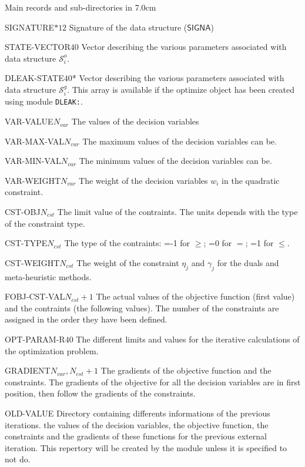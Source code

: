\begin{DescriptionEnregistrement}{Main records and sub-directories in }{7.0cm}

\CharEnr
{SIGNATURE}{$*12$}
{Signature of the data structure ($\mathsf{SIGNA}$)}

\IntEnr
{STATE-VECTOR}{$40$}
{Vector describing the various parameters associated with data structure $\mathcal{S}^{o}_{i}$.}

\OptIntEnr
{DLEAK-STATE}{$40$}{*}
{Vector describing the various parameters associated with data structure $\mathcal{S}^{g}_{i}$. This array is
 available if the {\sc optimize} object has been created using module {\tt DLEAK:}.}

\RealEnr
{VAR-VALUE}{$N_{var}$}{}
{The values of the decision variables}

\RealEnr
{VAR-MAX-VAL}{$N_{var}$}{}
{The maximum values of the decision variables can be.}

\RealEnr
{VAR-MIN-VAL}{$N_{var}$}{}
{The minimum values of the decision variables can be.}

\RealEnr
{VAR-WEIGHT}{$N_{var}$}{}
{The weight of the decision variables $w_{i}$ in the quadratic constraint.}

\RealEnr
{CST-OBJ}{$N_{cst}$}{}
{The limit value of the contraints. The units depends with the type of the constraint type.}

\IntEnr
{CST-TYPE}{$N_{cst}$}
{The type of the contraints: =-1 for $\geq$; =0 for $=$; =1 for $\leq$.}

\RealEnr
{CST-WEIGHT}{$N_{cst}$}{}
{The weight of the constraint $\eta_{j}$ and $\gamma_{j}$ for the duals and meta-heuristic methods.}

\RealEnr
{FOBJ-CST-VAL}{$N_{cst}+1$}{}
{The actual values of the objective function (first value) and the contraints (the following values). The
number of the constraints are assigned in the order they have been defined.}

\RealEnr
{OPT-PARAM-R}{$40$}{}
{The different limits and values for the iterative calculations of the optimization problem.}

\RealEnr
{GRADIENT}{$N_{var}, N_{cst}+1$}{}
{The gradients of the objective function and the constraints. The gradients of the objective for all the
decision variables are in first position, then follow the gradients of the constraints.}

\DirEnr
{OLD-VALUE}
{Directory containing differents informations of the previous iterations. the values of the decision
variables, the objective function, the constraints and the gradients of these functions for the previous
external iteration. This repertory will be created by the module  unless it is specified to not do.}

\end{DescriptionEnregistrement}


